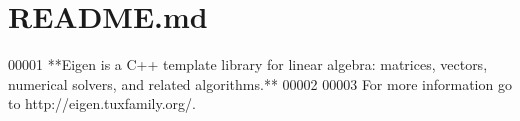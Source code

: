 \hypertarget{eigen_2_r_e_a_d_m_e_8md_source}{}\section{R\+E\+A\+D\+M\+E.\+md}

\begin{DoxyCode}
00001 **Eigen is a C++ template library for linear algebra: matrices, vectors, numerical solvers, and
       related algorithms.**
00002 
00003 For more information go to http://eigen.tuxfamily.org/.
\end{DoxyCode}
